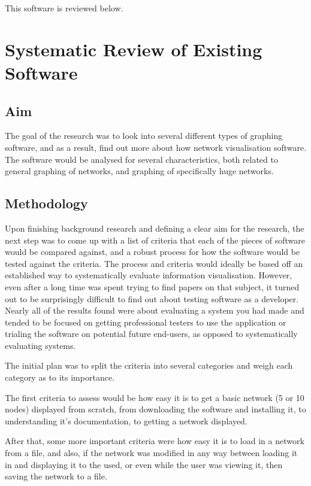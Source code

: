 \documentclass[../dissertation.tex]{subfiles}
\begin{document}
This software is reviewed below.

\section{Systematic Review of Existing Software}

\subsection{Aim} 

The goal of the research was to look into several different types of graphing software, and as a result, find out more about how network visualisation software. The software would be analysed for several characteristics, both related to general graphing of networks, and graphing of specifically huge networks.

\subsection{Methodology}

Upon finishing background research and defining a clear aim for the research, the next step was to come up with a list of criteria that each of the pieces of software would be compared against, and a robust process for how the software would be tested against the criteria. The process and criteria would ideally be based off an established way to systematically evaluate information visualisation. However, even after a long time was spent trying to find papers on that subject, it turned out to be surprisingly difficult to find out about testing software as a developer. Nearly all of the results found were about evaluating a system you had made and tended to be focused on getting professional testers to use the application or trialing the software on potential future end-users, as opposed to systematically evaluating systems.

The initial plan was to split the criteria into several categories and weigh each category as to its importance. 

The first criteria to assess would be how easy it is to get a basic network (5 or 10 nodes) displayed from scratch, from downloading the software and installing it, to understanding it's documentation, to getting a network displayed. 

After that, some more important criteria were how easy it is to load in a network from a file, and also, if the network was modified in any way between loading it in and displaying it to the used, or even while the user was viewing it, then saving the network to a file. 
\end{document}
